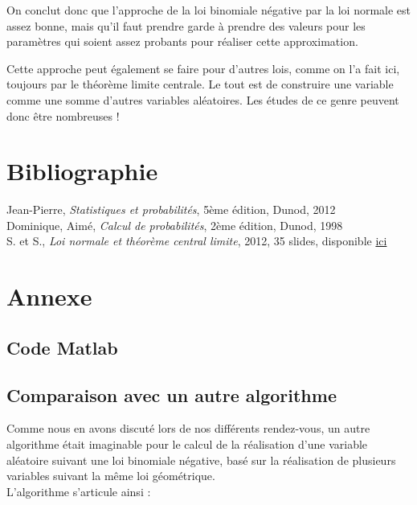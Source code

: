 \documentclass{article}
\begin{document}
On conclut donc que l'approche de la loi binomiale négative par la loi normale est assez bonne, mais qu'il faut prendre garde à prendre des valeurs pour les paramètres qui soient assez probants pour réaliser cette approximation. 

\bigskip
Cette approche peut également se faire pour d'autres lois, comme on l'a fait ici, toujours par le théorème limite centrale. Le tout est de construire une variable comme une somme d'autres variables aléatoires. Les études de ce genre peuvent donc être nombreuses !

\newpage
\section*{Bibliographie}
\noindent {} Jean-Pierre, \textit{Statistiques et probabilités}, 5ème édition, Dunod, 2012 \\
 Dominique,  Aimé, \textit{Calcul de probabilités}, 2ème édition, Dunod, 1998 \\

\noindent {} S. et  S., \textit{Loi normale et théorème central limite}, 2012, 35 slides, disponible \href{http://www.gerad.ca/Sebastien.Le.Digabel/MTH2302D/7_loi_normale.pdf}{ici}

\newpage
\appendix
\section{Annexe}
\subsection*{Code Matlab}


\newpage
\subsection*{Comparaison avec un autre algorithme}
Comme nous en avons discuté lors de nos différents rendez-vous, un autre algorithme était imaginable pour le calcul de la réalisation d'une variable aléatoire suivant une loi binomiale négative, basé sur la réalisation de plusieurs variables suivant la même loi géométrique.\\
L'algorithme s'articule ainsi :
\end{document}
